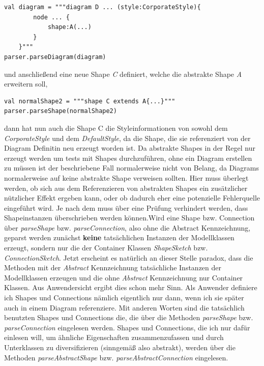 \begin{lstlisting}[style = scala, aboveskip=0pt]
val diagram = """diagram D ... (style:CorporateStyle){
		node ... {
			shape:A(...)
		}
	}"""
parser.parseDiagram(diagram)
\end{lstlisting}und anschließend eine neue Shape \textit{C} definiert, welche die abstrakte Shape \textit{A} erweitern soll,
\begin{lstlisting}[style = scala, aboveskip=0pt]
val normalShape2 = """shape C extends A{...}"""
parser.parseShape(normalShape2)
\end{lstlisting}dann hat nun auch die Shape C die Styleinformationen von sowohl dem \textit{CorporateStyle} und dem \textit{DefaultStyle}, da die Shape, die sie referenziert von der Diagram Definitin neu erzeugt worden ist. Da abstrakte Shapes in der Regel nur erzeugt werden um tests mit Shapes durchzuführen, ohne ein Diagram erstellen zu müssen ist der beschriebene Fall normalerweise nicht von Belang, da Diagrams normalerweise auf keine abstrakte Shape verweisen sollten. Hier muss überlegt werden, ob sich aus dem Referenzieren von abstrakten Shapes ein zusätzlicher nützlicher Effekt ergeben kann, oder ob dadurch eher eine potenzielle Fehlerquelle eingeführt wird. Je nach dem muss über eine Prüfung verhindert werden, dass Shapeinstanzen überschrieben werden können.\linebreak Wird eine Shape bzw. Connection über \textit{parseShape} bzw. \textit{parseConnection}, also ohne die Abstract Kennzeichnung, geparst werden zunächst \textbf{keine} tatsächlichen Instanzen der Modellklassen erzeugt, sondern nur die der Container Klassen \textit{ShapeSketch} bzw. \textit{ConnectionSketch}. Jetzt erscheint es natürlich an dieser Stelle paradox, dass die Methoden mit der \textit{Abstract} Kennzeichnung tatsächliche Instanzen der Modellklassen erzeugen und die ohne \textit{Abstract} Kennzeichnung nur Container Klassen. Aus Anwendersicht ergibt dies schon mehr Sinn. Als Anwender definiere ich Shapes und Connections nämlich eigentlich nur dann, wenn ich sie später auch in einem Diagram referenziere. Mit anderen Worten sind die tatsächlich benutzten Shapes und Connections die, die über die Methoden \textit{parseShape} bzw. \textit{parseConnection} eingelesen werden. Shapes und Connections, die ich nur dafür einlesen will, um ähnliche Eigenschaften zusammenzufassen und durch Unterklassen zu diversifizieren (sinngemäß also abstrakt), werden über die Methoden \textit{parseAbstractShape} bzw. \textit{parseAbstractConnection} eingelesen.
